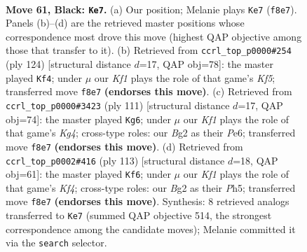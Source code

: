 \documentclass[11pt]{article}
\begin{document}
\clearpage

\begin{figure}[p]\centering
\begin{subfigure}{0.46\textwidth}\centering
\resizebox{\linewidth}{!}{%
\newchessgame
\chessboard[
  setfen={1R3k2/8/6p1/8/1P6/R7/1r4b1/6K1 b - - 1 61},
  showmover=false,
  pgfstyle=straightmove, color=movearrow, markmove={f8-e7}
]}
\caption{}
\end{subfigure}\hfill
\begin{subfigure}{0.46\textwidth}\centering
\resizebox{\linewidth}{!}{%
\newchessgame
\chessboard[
  setfen={8/5k2/8/1r3K2/7P/8/1p6/1R6 w - - 11 63},
  showmover=false,
  pgfstyle=straightmove, color=movearrow, markmove={f5-f4}
]}
\caption{}
\end{subfigure}
\\[4pt]
\begin{subfigure}{0.46\textwidth}\centering
\resizebox{\linewidth}{!}{%
\newchessgame
\chessboard[
  setfen={1r6/8/1P2p3/1R4k1/8/5K2/8/8 b - - 4 56},
  showmover=false,
  pgfstyle=straightmove, color=movearrow, markmove={g5-g6}
]}
\caption{}
\end{subfigure}\hfill
\begin{subfigure}{0.46\textwidth}\centering
\resizebox{\linewidth}{!}{%
\newchessgame
\chessboard[
  setfen={2r5/2P5/8/2R2k1p/7K/8/8/8 b - - 1 57},
  showmover=false,
  pgfstyle=straightmove, color=movearrow, markmove={f5-f6}
]}
\caption{}
\end{subfigure}
\caption{\textbf{Move 61, Black: \texttt{Ke7}.} (a) Our position; Melanie plays \texttt{Ke7} (\texttt{f8e7}). Panels (b)--(d) are the retrieved master positions whose correspondence most drove this move (highest QAP objective among those that transfer to it). (b) Retrieved from \texttt{ccrl\_top\_p0000\#254} (ply 124) [structural distance $d$=17, QAP obj=78]: the master played \texttt{Kf4}; under $\mu$ our \emph{Kf1} plays the role of that game's \emph{Kf5}; transferred move \texttt{f8e7} \textbf{(endorses this move)}. (c) Retrieved from \texttt{ccrl\_top\_p0000\#3423} (ply 111) [structural distance $d$=17, QAP obj=74]: the master played \texttt{Kg6}; under $\mu$ our \emph{Kf1} plays the role of that game's \emph{Kg4}; cross-type roles: our \emph{B}g2 as their \emph{P}e6; transferred move \texttt{f8e7} \textbf{(endorses this move)}. (d) Retrieved from \texttt{ccrl\_top\_p0002\#416} (ply 113) [structural distance $d$=18, QAP obj=61]: the master played \texttt{Kf6}; under $\mu$ our \emph{Kf1} plays the role of that game's \emph{Kf4}; cross-type roles: our \emph{B}g2 as their \emph{P}h5; transferred move \texttt{f8e7} \textbf{(endorses this move)}. Synthesis: 8 retrieved analogs transferred to \texttt{Ke7} (summed QAP objective 514, the strongest correspondence among the candidate moves); Melanie committed it via the \texttt{search} selector.}
\label{fig:thought-m121}
\end{figure}
\end{document}
